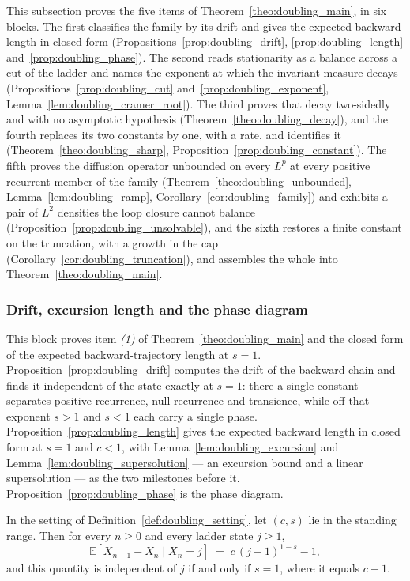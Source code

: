 This subsection proves the five items of Theorem~\ref{theo:doubling_main}, in six blocks. The
first classifies the family by its drift and gives the expected backward length in closed form
(Propositions~\ref{prop:doubling_drift}, \ref{prop:doubling_length}
and~\ref{prop:doubling_phase}). The second reads stationarity as a balance across a cut of the
ladder and names the exponent at which the invariant measure decays
(Propositions~\ref{prop:doubling_cut} and~\ref{prop:doubling_exponent},
Lemma~\ref{lem:doubling_cramer_root}). The third proves that decay two-sidedly and with no
asymptotic hypothesis (Theorem~\ref{theo:doubling_decay}), and the fourth replaces its two
constants by one, with a rate, and identifies it (Theorem~\ref{theo:doubling_sharp},
Proposition~\ref{prop:doubling_constant}). The fifth proves the diffusion operator unbounded on
every $L^p$ at every positive recurrent member of the family
(Theorem~\ref{theo:doubling_unbounded}, Lemma~\ref{lem:doubling_ramp},
Corollary~\ref{cor:doubling_family}) and exhibits a pair of $L^2$ densities the loop closure
cannot balance (Proposition~\ref{prop:doubling_unsolvable}), and the sixth restores a finite
constant on the
truncation, with a growth in the cap (Corollary~\ref{cor:doubling_truncation}), and assembles
the whole into Theorem~\ref{theo:doubling_main}.

\subsubsection{Drift, excursion length and the phase diagram}

This block proves item \emph{(1)} of Theorem~\ref{theo:doubling_main} and the closed form of the
expected backward-trajectory length at $s=1$. Proposition~\ref{prop:doubling_drift} computes the drift of the
backward chain and finds it independent of the state exactly at $s=1$: there a single constant
separates positive recurrence, null recurrence and transience, while off that exponent
$s>1$ and $s<1$ each carry a single phase. Proposition~\ref{prop:doubling_length} gives the expected backward length
in closed form at $s=1$ and $c<1$, with Lemma~\ref{lem:doubling_excursion} and
Lemma~\ref{lem:doubling_supersolution} --- an excursion bound and a linear supersolution --- as
the two milestones before it. Proposition~\ref{prop:doubling_phase} is the phase diagram.

\begin{proposition}\label{prop:doubling_drift}
In the setting of Definition~\ref{def:doubling_setting}, let $(c,s)$ lie in the standing
range. Then for every $n\geq0$ and every ladder state $j\geq1$,
\begin{equation}\label{eq:doubling_drift}
    \mathbb E\left[X_{n+1}-X_n\mid X_n=j\right]\;=\;c\,(j+1)^{1-s}-1 ,
\end{equation}
and this quantity is independent of $j$ if and only if $s=1$, where it equals $c-1$.
\end{proposition}

